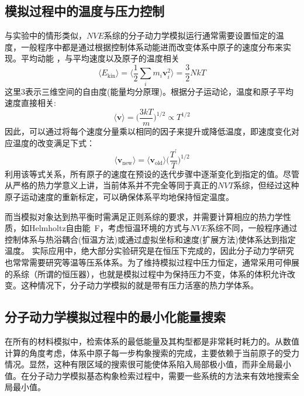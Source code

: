 \subsection{模拟过程中的温度与压力控制}
与实验中的情形类似，$NVE$系综的分子动力学模拟运行通常需要设置恒定的温度，一般程序中都是通过根据控制体系动能进而改变体系中原子的速度分布来实现。平均动能 ，与平均速度以及原子的温度相关
\begin{equation}
	\langle E_{\mathrm{kin}}\rangle=\bigg\langle\dfrac12\sum_im_i\mathbf{v}_i^2\bigg\rangle=\dfrac32NkT
	\label{eq:MD_molecular_kinetic}
\end{equation}
这里3表示三维空间的自由度(能量均分原理)。根据分子运动论，温度和原子平均速度直接相关:
\begin{displaymath}
	\langle\mathbf{v}\rangle=\bigg(\dfrac{3kT}m\bigg)^{1/2}\propto T^{1/2}
\end{displaymath} 
因此，可以通过将每个速度分量乘以相同的因子来提升或降低温度，即速度变化对应温度的改变满足下式：
\begin{equation}
	\langle\mathbf{v}_{\mathrm{new}}\rangle=\langle\mathbf{v}_{\mathrm{old}}\rangle\bigg(\dfrac{T^{\prime}}T\bigg)^{1/2}
	\label{eq:MD_velocity_relation}
\end{equation}
利用该等式关系，所有原子的速度在预设的迭代步骤中逐渐变化到指定的值。尽管从严格的热力学意义上讲，当前体系并不完全等同于真正的$NVT$系综，但经过这种原子运动速度的重新标定，可以确保体系平均地保持恒定温度。

而当模拟对象达到热平衡时需满足正则系综的要求，并需要计算相应的热力学性质，如\textrm{Helmholtz}自由能~\textrm{F}，考虑恒温环境的方式与$NVE$系综不同，一般程序通过控制体系与热浴耦合(恒温方法)或通过虚拟坐标和速度(扩展方法)使体系达到指定温度。
实际应用中，绝大部分实验研究是在恒压下完成的，因此分子动力学研究也常常需要研究等温等压系体系。为了维持模拟过程中压力恒定，通常采用可伸展的系综（所谓的恒压器），也就是模拟过程中为保持压力不变，体系的体积允许改变。这种情况下，分子动力学模拟的就是带有压力活塞的热力学体系。
\subsection{分子动力学模拟过程中的最小化能量搜索}
在所有的材料模拟中，检索体系的最低能量及其构型都是非常耗时耗力的。从数值计算的角度考虑，体系中原子每一步构象搜索的完成，主要依赖于当前原子的受力情况。显然，这种有限区域的搜索很可能使体系陷入局部极小值，而非全局最小值。在分子动力学模拟基态构象检索过程中，需要一些系统的方法来有效地搜索全局最小值。
